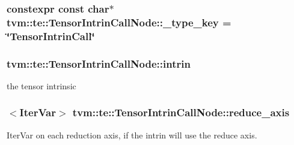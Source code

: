 \subsubsection[{\texorpdfstring{\+\_\+type\+\_\+key}{_type_key}}]{\setlength{\rightskip}{0pt plus 5cm}constexpr const char$\ast$ tvm\+::te\+::\+Tensor\+Intrin\+Call\+Node\+::\+\_\+type\+\_\+key = \char`\"{}Tensor\+Intrin\+Call\char`\"{}\hspace{0.3cm}{\ttfamily [static]}}\hypertarget{classtvm_1_1te_1_1TensorIntrinCallNode_aa58faae58da2ce9f2a46aa6664e85f36}{}\label{classtvm_1_1te_1_1TensorIntrinCallNode_aa58faae58da2ce9f2a46aa6664e85f36}
\subsubsection[{\texorpdfstring{intrin}{intrin}}]{ tvm\+::te\+::\+Tensor\+Intrin\+Call\+Node\+::intrin}\hypertarget{classtvm_1_1te_1_1TensorIntrinCallNode_adf0605632cdbe20556abffee3aa3850e}{}\label{classtvm_1_1te_1_1TensorIntrinCallNode_adf0605632cdbe20556abffee3aa3850e}


the tensor intrinsic 

\subsubsection[{\texorpdfstring{reduce\+\_\+axis}{reduce_axis}}]{$<${\bf Iter\+Var}$>$ tvm\+::te\+::\+Tensor\+Intrin\+Call\+Node\+::reduce\+\_\+axis}\hypertarget{classtvm_1_1te_1_1TensorIntrinCallNode_a3bd0fd4dc7145a22d38d62037838ccfe}{}\label{classtvm_1_1te_1_1TensorIntrinCallNode_a3bd0fd4dc7145a22d38d62037838ccfe}


Iter\+Var on each reduction axis, if the intrin will use the reduce axis. 

